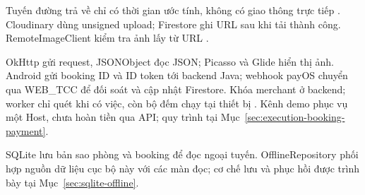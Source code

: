 Tuyến đường trả về chỉ có thời gian ước tính, không có giao thông trực tiếp \parencite{maplibre_android,maptiler_geocoding,ors_directions}. Cloudinary dùng unsigned upload; Firestore ghi URL sau khi tải thành công. RemoteImageClient kiểm tra ảnh lấy từ URL \parencite{cloudinary_unsigned}.

OkHttp gửi request, JSONObject đọc JSON; Picasso và Glide hiển thị ảnh. Android gửi booking ID và ID token tới backend Java; webhook payOS chuyển qua WEB\_TCC để đối soát và cập nhật Firestore. Khóa merchant ở backend; worker chỉ quét khi có việc, còn bộ đếm chạy tại thiết bị \parencite{payos_java,payos_webhook,firebase_listeners}. Kênh demo phục vụ một Host, chưa hoàn tiền qua API; quy trình tại Mục~\ref{sec:execution-booking-payment}.

SQLite lưu bản sao phòng và booking để đọc ngoại tuyến. OfflineRepository phối hợp nguồn dữ liệu cục bộ này với các màn đọc; cơ chế lưu và phục hồi được trình bày tại Mục~\ref{sec:sqlite-offline}.
